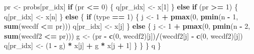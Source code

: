 \documentclass[
]{article}
\newenvironment{Shaded}{\begin{snugshade}}{\end{snugshade}}
\newcommand{\ControlFlowTok}[1]{\textcolor[rgb]{0.13,0.29,0.53}{\textbf{#1}}}
\newcommand{\DecValTok}[1]{\textcolor[rgb]{0.00,0.00,0.81}{#1}}
\newcommand{\FunctionTok}[1]{\textcolor[rgb]{0.13,0.29,0.53}{\textbf{#1}}}
\newcommand{\NormalTok}[1]{#1}
\newcommand{\OtherTok}[1]{\textcolor[rgb]{0.56,0.35,0.01}{#1}}
\newcommand{\SpecialCharTok}[1]{\textcolor[rgb]{0.81,0.36,0.00}{\textbf{#1}}}
\begin{document}
\begin{Shaded}
\begin{Highlighting}[]
\NormalTok{    pr }\OtherTok{\textless{}{-}}\NormalTok{ probs[pr\_idx]}
    \ControlFlowTok{if}\NormalTok{ (pr }\SpecialCharTok{\textless{}=} \DecValTok{0}\NormalTok{) \{}
\NormalTok{      q[pr\_idx] }\OtherTok{\textless{}{-}}\NormalTok{ x[}\DecValTok{1}\NormalTok{]}
\NormalTok{    \}}
    \ControlFlowTok{else} \ControlFlowTok{if}\NormalTok{ (pr }\SpecialCharTok{\textgreater{}=} \DecValTok{1}\NormalTok{) \{}
\NormalTok{      q[pr\_idx] }\OtherTok{\textless{}{-}}\NormalTok{ x[n]}
\NormalTok{    \}}
    \ControlFlowTok{else}\NormalTok{ \{}
      \ControlFlowTok{if}\NormalTok{ (type }\SpecialCharTok{==} \DecValTok{1}\NormalTok{) \{}
\NormalTok{        j }\OtherTok{\textless{}{-}} \DecValTok{1} \SpecialCharTok{+} \FunctionTok{pmax}\NormalTok{(}\DecValTok{0}\NormalTok{, }\FunctionTok{pmin}\NormalTok{(n }\SpecialCharTok{{-}} \DecValTok{1}\NormalTok{, }\FunctionTok{sum}\NormalTok{(wecdf }\SpecialCharTok{\textless{}=}\NormalTok{ pr)))}
\NormalTok{        q[pr\_idx] }\OtherTok{\textless{}{-}}\NormalTok{ x[j]}
\NormalTok{      \}}
      \ControlFlowTok{else}\NormalTok{ \{}
\NormalTok{        j }\OtherTok{\textless{}{-}} \DecValTok{1} \SpecialCharTok{+} \FunctionTok{pmax}\NormalTok{(}\DecValTok{0}\NormalTok{, }\FunctionTok{pmin}\NormalTok{(n }\SpecialCharTok{{-}} \DecValTok{2}\NormalTok{, }\FunctionTok{sum}\NormalTok{(wecdf2 }\SpecialCharTok{\textless{}=}\NormalTok{ pr)))}
\NormalTok{        g }\OtherTok{\textless{}{-}}\NormalTok{ (pr }\SpecialCharTok{{-}} \FunctionTok{c}\NormalTok{(}\DecValTok{0}\NormalTok{, wecdf2)[j])}\SpecialCharTok{/}\NormalTok{(wecdf2[j] }\SpecialCharTok{{-}} \FunctionTok{c}\NormalTok{(}\DecValTok{0}\NormalTok{, }
\NormalTok{                                                   wecdf2)[j])}
\NormalTok{        q[pr\_idx] }\OtherTok{\textless{}{-}}\NormalTok{ (}\DecValTok{1} \SpecialCharTok{{-}}\NormalTok{ g) }\SpecialCharTok{*}\NormalTok{ x[j] }\SpecialCharTok{+}\NormalTok{ g }\SpecialCharTok{*}\NormalTok{ x[j }\SpecialCharTok{+} \DecValTok{1}\NormalTok{]}
\NormalTok{      \}}
\NormalTok{    \}}
\NormalTok{  \}}
\NormalTok{  q}
\NormalTok{\}}


\end{Highlighting}
\end{Shaded}
\end{document}
